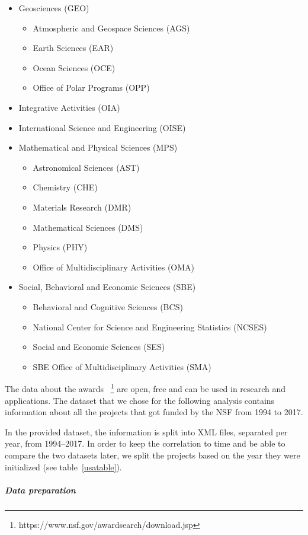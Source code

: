 \documentclass[12pt]{report}
\begin{document}
\begin{itemize}
\item Geosciences (GEO)
\begin{itemize}
\item[] Atmospheric and Geospace Sciences (AGS)
\item[] Earth Sciences (EAR)
\item[] Ocean Sciences (OCE)
\item[] Office of Polar Programs (OPP)
\end{itemize}
\item Integrative Activities (OIA)
\item International Science and Engineering (OISE)
\item Mathematical and Physical Sciences (MPS)
\begin{itemize}
\item[] Astronomical Sciences (AST)
\item[] Chemistry (CHE)
\item[] Materials Research (DMR)
\item[] Mathematical Sciences (DMS)
\item[] Physics (PHY)
\item[] Office of Multidisciplinary Activities (OMA)
\end{itemize}
\item Social, Behavioral and Economic Sciences (SBE)
\begin{itemize}
\item[] Behavioral and Cognitive Sciences (BCS)
\item[] National Center for Science and Engineering Statistics (NCSES)
\item[] Social and Economic Sciences (SES)
\item[] SBE Office of Multidisciplinary Activities (SMA)
\end{itemize}
\end{itemize}
The data about the awards
~\footnote{https://www.nsf.gov/awardsearch/download.jsp} are open, free and can
be used in research and applications. The dataset that we chose for the
following analysis contains information about all the projects that got funded
by the NSF from 1994 to 2017.
 
In the provided dataset, the information is split into XML files, separated
per year, from 1994--2017. In order to keep the correlation to time and be able
to compare the two datasets later, we split the projects based on the year
they were initialized (see table~\ref{usatable}).


\subparagraph{Data preparation}
\end{document}
